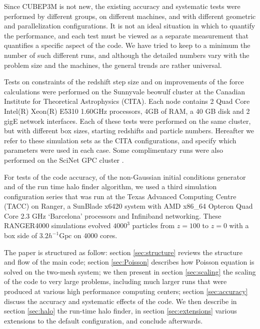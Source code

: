 \documentclass[useAMS,usenatbib]{mn2e}
\begin{document}

Since {\small CUBEP3M} is not new, the existing  accuracy and systematic tests were performed by different groups, on different machines,
and with different geometric and parallelization configurations. It is not an ideal situation in which to quantify the performance, and each test must be viewed as a
separate measurement that quantifies a specific aspect of the code. 
We have tried to keep to a minimum the number of such different runs, and although the detailed numbers vary 
with the problem size and the machines, the general trends are rather universal.

Tests on constraints of the redshift step size and on improvements of the force calculations were performed 
on the Sunnyvale beowulf cluster at the Canadian Institute for Theoretical Astrophysics (CITA).
Each node contains 2 Quad Core Intel(R) Xeon(R) E5310 1.60GHz processors, 4GB of RAM,  a 40 GB disk and 2 gigE network interfaces. 
Each of these tests were performed on the same cluster, but with  different box sizes, starting redshifts and particle numbers.
Hereafter we refer to these simulation sets as the CITA configurations, and specify which parameters were used in each case.
Some complimentary runs were also performed on the SciNet GPC cluster \citep{Scinet}.

For tests of the code accuracy, of the non-Gaussian initial conditions generator and of the run time halo finder algorithm, 
we used a third simulation configuration series that was run at the Texas Advanced Computing Centre (TACC) on Ranger, a SunBlade 
x6420 system with AMD x86\_64 Opteron Quad Core 2.3 GHz `Barcelona' processors and Infiniband networking.
These RANGER4000 simulations evolved $4000^{3}$ particles 
from $z=100$ to $z=0$ with a box side of $3.2 h^{-1}\mbox{Gpc}$
on 4000 cores.
 

The paper is structured as follow: section \ref{sec:structure} reviews the structure and flow of the main code;
section \ref{sec:Poisson} describes how Poisson equation is solved on the two-mesh system;
we then present in section \ref{sec:scaling} the scaling of the code to very large problems,
including much larger runs that were produced at various high performance computing centers;
section \ref{sec:accuracy}  discuss the accuracy and systematic effects of the code.
 We then describe in section \ref{sec:halo} the run-time halo finder, in section \ref{sec:extensions} various extensions
 to the default configuration, and conclude afterwards.
\end{document}
